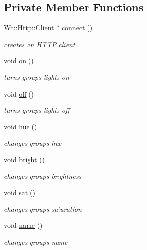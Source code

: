 \subsection*{Private Member Functions}
\begin{DoxyCompactItemize}
\item 
Wt\+::\+Http\+::\+Client $\ast$ \hyperlink{class_single_groups_control_widget_a36a607a09994c4c2db5ec8e214d2d5bc}{connect} ()
\begin{DoxyCompactList}\small\item\em creates an H\+T\+TP client \end{DoxyCompactList}\item 
void \hyperlink{class_single_groups_control_widget_ae1b39e4fd180f949cc6161a5837b659f}{on} ()
\begin{DoxyCompactList}\small\item\em turns group\textquotesingle{}s lights on \end{DoxyCompactList}\item 
void \hyperlink{class_single_groups_control_widget_a80dc0058c8bf19461f74a2efc6e40bdf}{off} ()
\begin{DoxyCompactList}\small\item\em turns group\textquotesingle{}s lights off \end{DoxyCompactList}\item 
void \hyperlink{class_single_groups_control_widget_a5da8fa2f328e6484b3cc3940ff09dd77}{hue} ()
\begin{DoxyCompactList}\small\item\em changes group\textquotesingle{}s hue \end{DoxyCompactList}\item 
void \hyperlink{class_single_groups_control_widget_abb243f17f45cd2f2d86147764f660b3e}{bright} ()
\begin{DoxyCompactList}\small\item\em changes group\textquotesingle{}s brightness \end{DoxyCompactList}\item 
void \hyperlink{class_single_groups_control_widget_aa1a21d1a2f3eeb2f9f73bb59dfaa7371}{sat} ()
\begin{DoxyCompactList}\small\item\em changes group\textquotesingle{}s saturation \end{DoxyCompactList}\item 
void \hyperlink{class_single_groups_control_widget_af9f44ae5837c9588dc4242e7a1ad4d7a}{name} ()
\begin{DoxyCompactList}\small\item\em changes group\textquotesingle{}s name \end{DoxyCompactList}\item 

\end{DoxyCompactItemize}
